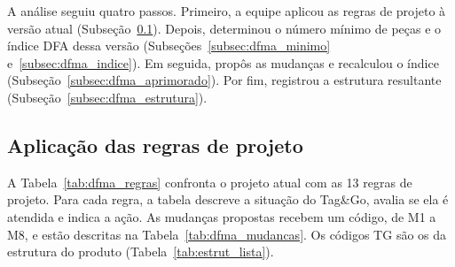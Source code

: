 A análise seguiu quatro passos. Primeiro, a equipe aplicou as regras de projeto à versão atual (Subseção~\ref{subsec:dfma_regras}). Depois, determinou o número mínimo de peças e o índice DFA dessa versão (Subseções~\ref{subsec:dfma_minimo} e~\ref{subsec:dfma_indice}). Em seguida, propôs as mudanças e recalculou o índice (Subseção~\ref{subsec:dfma_aprimorado}). Por fim, registrou a estrutura resultante (Subseção~\ref{subsec:dfma_estrutura}).

\subsection{Aplicação das regras de projeto}
\label{subsec:dfma_regras}

A Tabela~\ref{tab:dfma_regras} confronta o projeto atual com as 13 regras de projeto. Para cada regra, a tabela descreve a situação do Tag\&Go, avalia se ela é atendida e indica a ação. As mudanças propostas recebem um código, de M1 a M8, e estão descritas na Tabela~\ref{tab:dfma_mudancas}. Os códigos TG são os da estrutura do produto (Tabela~\ref{tab:estrut_lista}).

